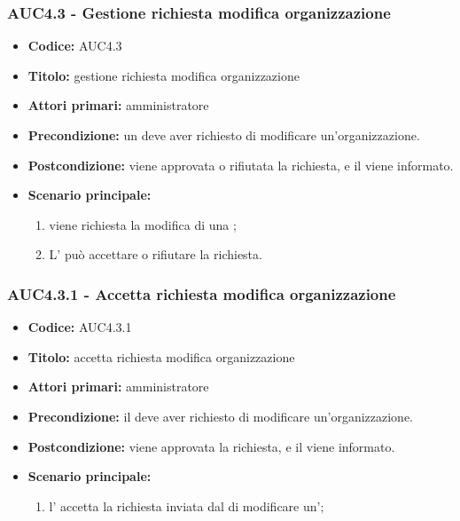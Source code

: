 \documentclass[casi-duso]{subfiles}
\begin{document}
\subsubsection{AUC4.3 - Gestione richiesta modifica organizzazione}
\label{subsub:AUC4.3}
\begin{itemize}
  \item \textbf{Codice:} AUC4.3
  \item \textbf{Titolo:} gestione richiesta modifica organizzazione
  \item \textbf{Attori primari:} amministratore
  \item \textbf{Precondizione:} un  deve aver richiesto di modificare un'organizzazione.
  \item \textbf{Postcondizione:} viene approvata o rifiutata la richiesta, e il  viene informato.
  \item \textbf{Scenario principale:} 
  \begin{enumerate}
    \item viene richiesta la modifica di una ;
    \item L' può accettare o rifiutare la richiesta.
  \end{enumerate}
\end{itemize}

\subsubsection{AUC4.3.1 - Accetta richiesta modifica organizzazione}
\label{subsub:AUC4.3.1}
\begin{itemize}
  \item \textbf{Codice:} AUC4.3.1
  \item \textbf{Titolo:} accetta richiesta modifica organizzazione
  \item \textbf{Attori primari:} amministratore
  \item \textbf{Precondizione:} il  deve aver richiesto di modificare un'organizzazione.
  \item \textbf{Postcondizione:} viene approvata la richiesta, e il  viene informato.
  \item \textbf{Scenario principale:} 
  \begin{enumerate}
    \item  l' accetta la richiesta inviata dal  di modificare un';
  \end{enumerate}
\end{itemize}
\end{document}
